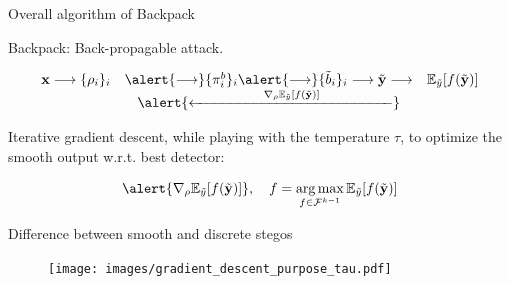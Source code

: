 \documentclass[10pt]{beamer}
\DeclareMathOperator*{\argmax}{arg\,max}
\begin{document}
\begin{frame}{Overall algorithm of Backpack}


\alert{Backpack}: \alert{Back-p}ropagable att\alert{ack}.

\begin{equation*}
    \begin{array}{ccc}
        \mathbf{x} \longrightarrow \{\rho_i\}_i & \alert{\longrightarrow}  \{\pi_i^b\}_i    \alert{\longrightarrow} \{\tilde{b}_i\}_i \longrightarrow  \tilde{\mathbf{y}}  \longrightarrow  & \mathbb{E}_{\tilde{y}}[f(\tilde{\mathbf{y}})] \\
        & \alert{\xleftarrow{\hspace{5em} \nabla_\rho \mathbb{E}_{\tilde{y}} [f(\tilde{\mathbf{y}})]\hspace{5em}}} 
    \end{array}
\end{equation*}

\pause

Iterative gradient descent, while playing with the temperature $\tau$, to optimize the smooth output w.r.t. best detector:

\begin{equation}
    \alert{\nabla_\rho \mathbb{E}_{\tilde{y}} [f(\tilde{\mathbf{y}})]}, \quad  f = \argmax_{f \in \mathcal{F}^{k-1}} \mathbb{E}_{\tilde{y}} [f(\tilde{\mathbf{y}})]
\end{equation}


\end{frame}

\begin{frame}{Difference between smooth and discrete stegos}
    \begin{figure}[h]
        \texttt{[image: images/gradient\_descent\_purpose\_tau.pdf]}
    \end{figure}
\end{frame}
\end{document}
